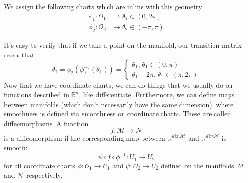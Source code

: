 \documentclass[11pt, a4paper]{article}   	%
\theoremstyle{slplain}
\begin{document}
We assign the following charts which are inline with this geometry
\begin{align*} 
\phi_1 : \mathcal{O}_1 &\rightarrow \theta_1 \in (0, 2 \pi ) \\
\phi_2 : \mathcal{O}_2 &\rightarrow \theta_2 \in ( - \pi , \pi ) 
\end{align*} 

It's easy to verify that if we take a point on the manifold, our transition matrix reads that 
\[ 
\theta_2 = \phi_2 ( \phi_1^{ -1} ( \theta_1) )  = \begin{cases} 
\theta_1, \, \theta_1 \in (0 , \pi ) \\
\theta_1  - 2 \pi,  \, \theta_1 \in ( \pi, 2 \pi ) 
\end{cases} 
\] 
Now that we have coordinate charts, we can do things that we usually do on functions described in $\mathbb{ R}^n $, like differentiate. 
Furthermore, we can define maps between manifolds (which don't necessarily have the same dimension), where smoothness is defined via smoothness on coordinate charts. These are called diffeomorphisms. A function 
\[
f: \mathcal{ M} \rightarrow \mathcal{ N } 
\]
is a diffeomorphism if the corresponding map between $\mathbb{R}^{ dim \mathcal{M} } $ and $\mathbb{R}^{ dim \mathcal{N } } $ is smooth: 
\[ 
\psi \circ f \circ \phi^{ -1} : U_1 \rightarrow U_2 
\] for all coordinate charts $\phi : \mathcal{O}_1 \rightarrow U_1$ and $\psi: \mathcal{O}_2 \rightarrow U_2$ defined on the manifolds $\mathcal{M}$ and $\mathcal{N}$ respectively. 
\end{document}
